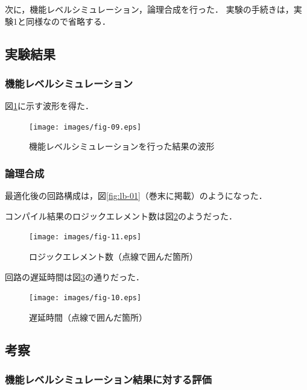 \documentclass[uplatex]{jsarticle}
\begin{document}
次に，機能レベルシミュレーション，論理合成を行った．
実験の手続きは，実験1と同様なので省略する．

\subsection{実験結果}

\subsubsection{機能レベルシミュレーション}

図\ref{fig:09}に示す波形を得た．

\begin{figure}[htb]
  \begin{center}
    \texttt{[image: images/fig-09.eps]}
    \caption{機能レベルシミュレーションを行った結果の波形}
    \label{fig:09}
  \end{center}
\end{figure}

\subsubsection{論理合成}

最適化後の回路構成は，図\ref{fig:lb-01}（巻末に掲載）のようになった．

コンパイル結果のロジックエレメント数は図\ref{fig:11}のようだった． 

\begin{figure}[htb]
  \begin{center}
    \texttt{[image: images/fig-11.eps]}
    \caption{ロジックエレメント数（点線で囲んだ箇所）}
    \label{fig:11}
  \end{center}
\end{figure}

回路の遅延時間は図\ref{fig:10}の通りだった．

\begin{figure}[htb]
  \begin{center}
    \texttt{[image: images/fig-10.eps]}
    \caption{遅延時間（点線で囲んだ箇所）}
    \label{fig:10}
  \end{center}
\end{figure}

\subsection{考察}

\subsubsection{機能レベルシミュレーション結果に対する評価}
\end{document}
